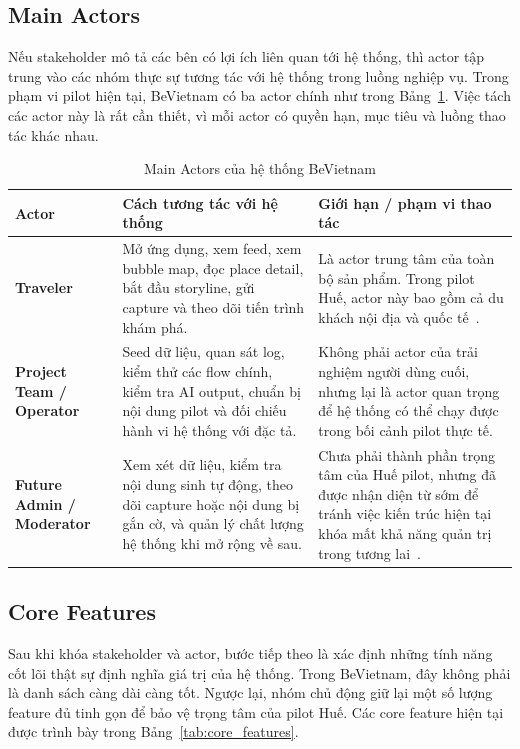 \subsection{Main Actors}
\contrib

Nếu stakeholder mô tả các bên có lợi ích liên quan tới hệ thống, thì
actor tập trung vào các nhóm thực sự tương tác với hệ thống trong luồng
nghiệp vụ. Trong phạm vi pilot hiện tại, BeVietnam có ba actor chính như
trong Bảng~\ref{tab:main_actors}. Việc tách các actor này là rất cần
thiết, vì mỗi actor có quyền hạn, mục tiêu và luồng thao tác khác nhau.

\begin{table}[H]
\centering
\caption{Main Actors của hệ thống BeVietnam}
\label{tab:main_actors}
\begin{tabularx}{\textwidth}{>{\raggedright\arraybackslash}p{3.1cm} X X}
\toprule
\textbf{Actor} & \textbf{Cách tương tác với hệ thống} & \textbf{Giới hạn / phạm vi thao tác} \\
\midrule
\textbf{Traveler} & Mở ứng dụng, xem feed, xem bubble map, đọc place detail, bắt đầu storyline, gửi capture và theo dõi tiến trình khám phá. & Là actor trung tâm của toàn bộ sản phẩm. Trong pilot Huế, actor này bao gồm cả du khách nội địa và quốc tế~\cite{bevietnam_spec}. \\
\textbf{Project Team / Operator} & Seed dữ liệu, quan sát log, kiểm thử các flow chính, kiểm tra AI output, chuẩn bị nội dung pilot và đối chiếu hành vi hệ thống với đặc tả. & Không phải actor của trải nghiệm người dùng cuối, nhưng lại là actor quan trọng để hệ thống có thể chạy được trong bối cảnh pilot thực tế. \\
\textbf{Future Admin / Moderator} & Xem xét dữ liệu, kiểm tra nội dung sinh tự động, theo dõi capture hoặc nội dung bị gắn cờ, và quản lý chất lượng hệ thống khi mở rộng về sau. & Chưa phải thành phần trọng tâm của Huế pilot, nhưng đã được nhận diện từ sớm để tránh việc kiến trúc hiện tại khóa mất khả năng quản trị trong tương lai~\cite{bevietnam_spec}. \\
\bottomrule
\end{tabularx}
\end{table}

\subsection{Core Features}
\contrib

Sau khi khóa stakeholder và actor, bước tiếp theo là xác định những tính
năng cốt lõi thật sự định nghĩa giá trị của hệ thống. Trong BeVietnam,
đây không phải là danh sách càng dài càng tốt. Ngược lại, nhóm chủ động
giữ lại một số lượng feature đủ tinh gọn để bảo vệ trọng tâm của pilot
Huế. Các core feature hiện tại được trình bày trong
Bảng~\ref{tab:core_features}.

